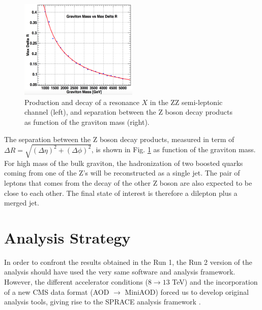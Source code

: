 \begin{figure}[htb!]
\begin{center}
\includegraphics[width=0.50\textwidth]{figures/objects/deltaRvsMass.png}
\caption[Production and decay channel]{Production and decay of a resonance $X$ in the ZZ semi-leptonic channel (left), and separation between the Z boson decay products as function of the graviton mass (right).}
\label{VZchannel}
\end{center}
\end{figure}

The separation between the Z boson decay products, measured in term of $\Delta R = \sqrt{(\Delta\eta)^2 + (\Delta\phi)^2}$, is shown in Fig. \ref{VZchannel} as function of the graviton mass. For high mass of the bulk graviton, the hadronization of two boosted quarks coming from one of the Z's will be reconstructed as a single jet. The pair of leptons that comes from the decay of the other Z boson are also expected to be close to each other. The final state of interest is therefore a dilepton plus a merged jet.

\clearpage
\section{Analysis Strategy}

In order to confront the results obtained in the Run 1, the Run 2 version of the analysis should have used the very same software and analysis framework. However, the different accelerator conditions ($8 \rightarrow 13$ TeV) and the incorporation of a new CMS data format (AOD $\rightarrow$ MiniAOD) forced us to develop original analysis tools, giving rise to the SPRACE analysis framework \cite{spraceFramework}.

